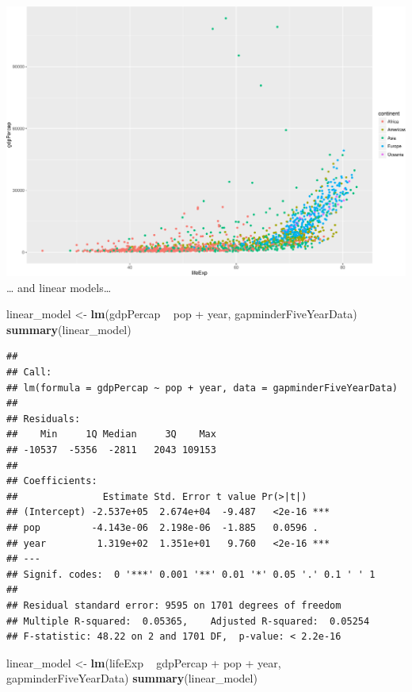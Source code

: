 \documentclass[]{article}
\newenvironment{Shaded}{\begin{snugshade}}{\end{snugshade}}
\newcommand{\KeywordTok}[1]{\textcolor[rgb]{0.13,0.29,0.53}{\textbf{{#1}}}}
\newcommand{\StringTok}[1]{\textcolor[rgb]{0.31,0.60,0.02}{{#1}}}
\newcommand{\NormalTok}[1]{{#1}}
\begin{document}
\includegraphics{Figs/unnamed-chunk-7-1.pdf}\\
\ldots{} and linear models\ldots{}

\begin{Shaded}
\begin{Highlighting}[]
\NormalTok{linear_model <-}\StringTok{ }\KeywordTok{lm}\NormalTok{(gdpPercap ~}\StringTok{ }\NormalTok{pop +}\StringTok{ }\NormalTok{year, gapminderFiveYearData)}
\KeywordTok{summary}\NormalTok{(linear_model)}
\end{Highlighting}
\end{Shaded}

\begin{verbatim}
## 
## Call:
## lm(formula = gdpPercap ~ pop + year, data = gapminderFiveYearData)
## 
## Residuals:
##    Min     1Q Median     3Q    Max 
## -10537  -5356  -2811   2043 109153 
## 
## Coefficients:
##               Estimate Std. Error t value Pr(>|t|)    
## (Intercept) -2.537e+05  2.674e+04  -9.487   <2e-16 ***
## pop         -4.143e-06  2.198e-06  -1.885   0.0596 .  
## year         1.319e+02  1.351e+01   9.760   <2e-16 ***
## ---
## Signif. codes:  0 '***' 0.001 '**' 0.01 '*' 0.05 '.' 0.1 ' ' 1
## 
## Residual standard error: 9595 on 1701 degrees of freedom
## Multiple R-squared:  0.05365,    Adjusted R-squared:  0.05254 
## F-statistic: 48.22 on 2 and 1701 DF,  p-value: < 2.2e-16
\end{verbatim}

\begin{Shaded}
\begin{Highlighting}[]
\NormalTok{linear_model <-}\StringTok{ }\KeywordTok{lm}\NormalTok{(lifeExp ~}\StringTok{ }\NormalTok{gdpPercap +}\StringTok{ }\NormalTok{pop +}\StringTok{ }\NormalTok{year, gapminderFiveYearData)}
\KeywordTok{summary}\NormalTok{(linear_model)}
\end{Highlighting}
\end{Shaded}
\end{document}
